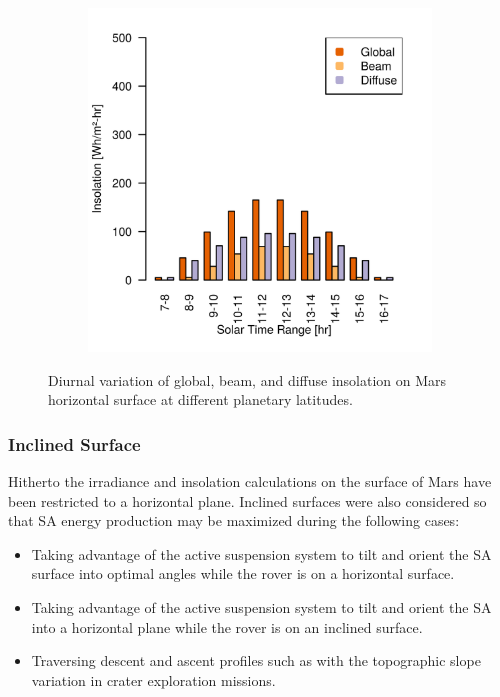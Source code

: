 \begin{figure}[h]
\begin{subfigure}[t]{\subfigureWidth}
  		\label{fig:sub:insolation-phi-0}
  	\end{subfigure}\hfill
	   \begin{subfigure}[t]{\subfigureWidth}
      \centering
  		\includegraphics[height=\graphicsHeight]{sections/mars-solar-energy/solar-radiation/plots/ih-ibh-and-idh-variation-4-for-ls-71-phi-40-tau-05-and-albedo-027}
  		\label{fig:sub:insolation-phi-p20}
	   \end{subfigure}\hfill
	\caption{Diurnal variation of global, beam, and diffuse insolation on Mars horizontal surface at different planetary latitudes.}
	\label{fig:plot:insolation-phi}
\vspace{-2ex}
\end{figure}

\clearpage
\subsubsection{Inclined Surface}
\label{sec:MartianEnvironment:SolarRadiation:InclinedSurface}

Hitherto the irradiance and insolation calculations on the surface of Mars have been restricted to a horizontal plane. Inclined surfaces were also considered so that \ac{SA} energy production may be maximized during the following cases:
\begin{itemize}
    \item Taking advantage of the active suspension system to tilt and orient the \ac{SA} surface into optimal angles while the rover is on a horizontal surface.
    \item Taking advantage of the active suspension system to tilt and orient the \ac{SA} into a horizontal plane while the rover is on an inclined surface.
    \item Traversing descent and ascent profiles such as with the topographic slope variation in crater exploration missions.
\end{itemize}

